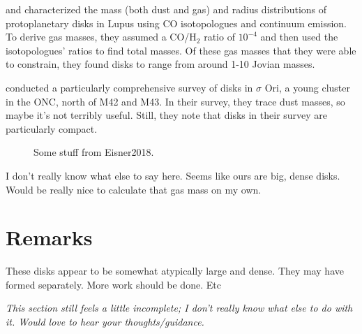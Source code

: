 \citet{Ansdell2016} and \citet{Ansdell2018} characterized the mass (both dust and gas) and radius distributions of protoplanetary disks in Lupus using CO isotopologues and continuum emission. To derive gas masses, they assumed a CO/H$_2$ ratio of $10^{-4}$ and then used the isotopologues' ratios to find total masses. Of these gas masses that they were able to constrain, they found disks to range from around 1-10 Jovian masses.


\citet{Eisner2018} conducted a particularly comprehensive survey of disks in $\sigma$ Ori, a young cluster in the ONC, north of M42 and M43. In their survey, they trace dust masses, so maybe it's not terribly useful. Still, they note that disks in their survey are particularly compact.

\begin{figure}[h!]
  \centering
    \hspace*{\fill}%
    \hspace*{\fill}%
    \caption{Some stuff from Eisner2018.}
    \label{fig:bf_disk_strs}
\end{figure}


I don't really know what else to say here. Seems like ours are big, dense disks. Would be really nice to calculate that gas mass on my own.



\section{Remarks}
These disks appear to be somewhat atypically large and dense. They may have formed separately. More work should be done. Etc





\textit{This section still feels a little incomplete; I don't really know what else to do with it. Would love to hear your thoughts/guidance.}






